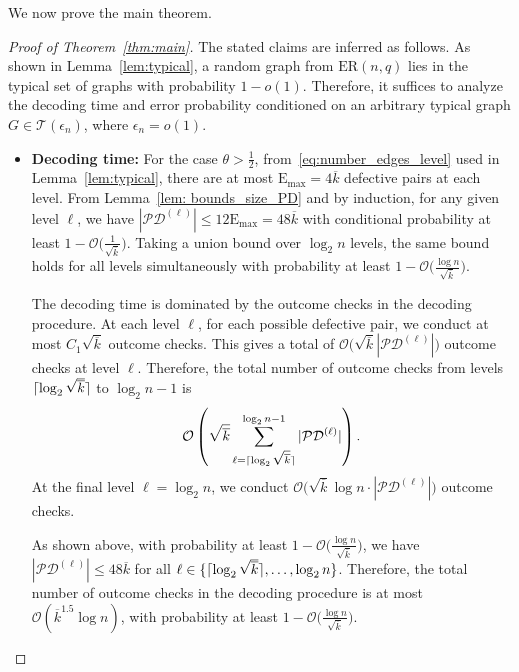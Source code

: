 \documentclass[journal]{IEEEtran}
\newcommand{\rEm}{\mathrm{E}_{\max}}
\theoremstyle{definition}
\theoremstyle{definition}
\newcommand{\Tc}{\mathcal{T}}
\newcommand{\ER}{\mathrm{ER}}
\newcommand{\kb}{\overline{k}}
\DeclarePairedDelimiter\ceil{\lceil}{\rceil}
\newcommand{\bigO}{\mathcal{O}}
\begin{document}
We now prove the main theorem.
\begin{proof}[Proof of Theorem~\ref{thm:main}] The stated claims are inferred as follows.
 As shown in Lemma~\ref{lem:typical}, a random graph from $\ER(n,q)$ lies in the typical set of graphs with probability $1-o(1)$. Therefore, it suffices to analyze the  decoding time and error probability conditioned on an arbitrary typical graph $G \in \Tc(\epsilon_n)$, where $\epsilon_n = o(1)$.
\begin{itemize}
     
	\item \textbf{Decoding time:} 
		For the case \( \theta > \frac{1}{2} \), from~\eqref{eq:number_edges_level} used in Lemma~\ref{lem:typical}, there are at most \(\rEm =  4\kb \) defective pairs at each level. From Lemma~\ref{lem: bounds_size_PD} and by induction, for any given level \( \ell \), we have \( |\mathcal{PD}^{(\ell)}| \leq 12\rEm =   48 \kb\) with conditional probability at least \( 1 - \bigO \big(\frac{1}{\sqrt{\kb}} \big) \). Taking a union bound over \( \log_2 n \) levels, the same bound holds for all levels simultaneously with probability at least \( 1 - \bigO \big( \frac{\log n}{\sqrt{\kb}} \big) \). 
		
		The decoding time is dominated by the outcome checks in the decoding procedure. At each level \( \ell \), for each possible defective pair, we conduct at most \( C_1 \sqrt{\kb} \) outcome checks. This gives a total of \( \bigO \big( \sqrt{\kb} |\mathcal{PD}^{(\ell)}| \big) \) outcome checks at level \( \ell \). Therefore, the total number of outcome checks from levels \( \ceil{\log_2 \sqrt{\kb}} \) to \( \log_2 n - 1 \) is 
		\[
		\bigO \left( \sqrt{\kb} \sum_{\ell = \ceil{\log_2 \sqrt{\kb}}}^{\log_2 n - 1} |\mathcal{PD}^{(\ell)}| \right).
		\]
		At the final level \( \ell  = \log_2 n \), we conduct \( \bigO \big( \sqrt{\kb} \log n \cdot |\mathcal{PD}^{(\ell)}| \big) \) outcome checks.
		
		As shown above, with probability at least \( 1 - \bigO \big( \frac{\log n}{\sqrt{\kb}} \big) \), we have \( |\mathcal{PD}^{(\ell)}| \leq 48\kb \) for all \( \ell \in \{\ceil{\log_2 \sqrt{\kb}}, \dots, \log_2 n\} \). Therefore, the total number of outcome checks in the decoding procedure is at most \( \bigO(\kb^{1.5} \log n) \), with probability at least \( 1 - \bigO \big( \frac{\log n}{\sqrt{\kb}} \big) \).
		

\end{itemize}
\end{proof}
\end{document}

